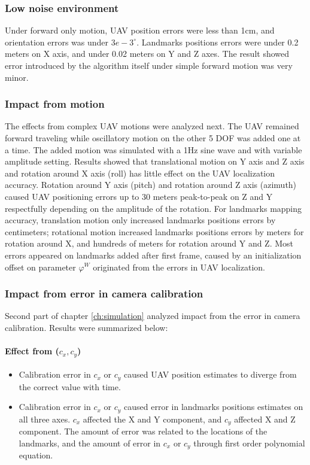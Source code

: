\subsubsection{Low noise environment}
Under forward only motion, UAV position errors were less than 1cm, and
orientation errors was under $3e-3^\circ$. Landmarks positions errors
were under 0.2 meters on X axis, and under 0.02 meters on Y and
Z axes. The result showed error introduced by the algorithm
itself under simple forward motion was very minor.

\subsubsection{Impact from motion}
The effects from complex UAV motions were analyzed next. The UAV
remained forward traveling while oscillatory motion on the other 5 DOF
was added one at a time. The added motion was simulated with a 1Hz
sine wave and with variable amplitude setting. Results showed that
translational motion on Y axis and Z axis and rotation around X axis
(roll) has little effect on the UAV localization accuracy. Rotation
around Y axis (pitch) and rotation around Z axis (azimuth) caused UAV
positioning errors up to 30 meters peak-to-peak on Z and Y
respectfully depending on the amplitude of the rotation. For landmarks
mapping accuracy, translation motion only increased landmarks
positions errors by centimeters; rotational motion increased landmarks
positions errors by meters for rotation around X, and hundreds of
meters for rotation around Y and Z. Most errors appeared on landmarks
added after first frame, caused by an initialization offset on
parameter $\varphi^W$ originated from the errors in UAV localization.

\subsubsection{Impact from error in camera calibration} 
Second part of chapter \ref{ch:simulation} analyzed impact from the
error in camera calibration. Results were summarized below:

\paragraph{Effect from ($c_x, c_y$)}
\begin{itemize}
  \item Calibration error in $c_x$ or $c_y$ caused UAV position estimates to diverge from the correct value with time.
  \item Calibration error in $c_x$ or $c_y$ caused error in landmarks
  positions estimates on all three axes. $c_x$ affected the X and Y
  component, and $c_y$ affected X and Z component. The amount of error
  was related to the locations of the landmarks, and the
  amount of error in $c_x$ or $c_y$ through first order polynomial equation.
\end{itemize}

